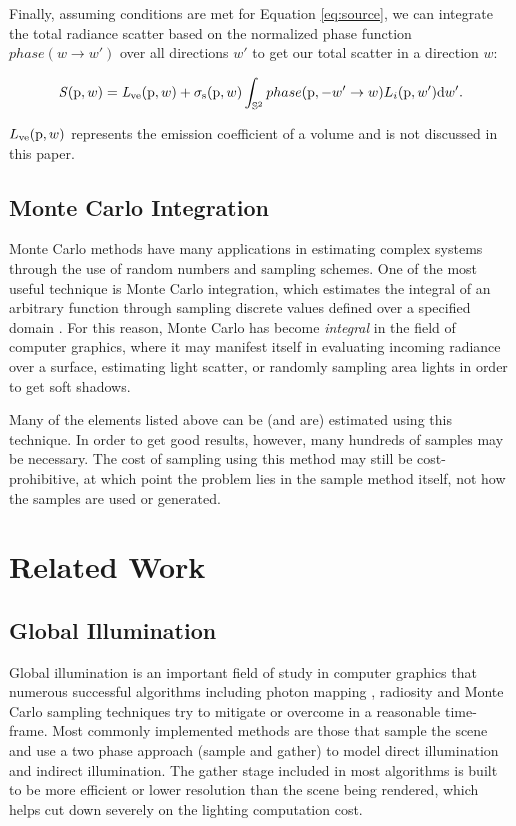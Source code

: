 \documentclass[12pt]{ucthesis}
\begin{document}
Finally, assuming conditions are met for Equation \ref{eq:source}, we can integrate the total radiance scatter based on the normalized phase function $phase(w \to w')$ over all directions $w'$ to get our total scatter in a direction $w$:

\begin{displaymath}
\mathit{S}(\textup{p},w) = \mathit{L}_{\textup{ve}}(\textup{p},w) + \sigma_{\textup{s}}(\textup{p}, w) \int_{\mathbb{S}^2} phase(\textup{p}, -w' \to w) L_{i}(\textup{p},w')\textup{d}w'.
\end{displaymath}

$L_{\textup{ve}}(\textup{p}, w)$ represents the emission coefficient of a volume and is not discussed in this paper.


\section{Monte Carlo Integration}

Monte Carlo methods have many applications in estimating complex systems through the use of random numbers and sampling schemes.  One of the most useful technique is Monte Carlo integration, which estimates the integral of an arbitrary function through sampling discrete values defined over a specified domain \cite{aga}.  For this reason, Monte Carlo has become \textit{integral} in the field of computer graphics, where it may manifest itself in evaluating incoming radiance over a surface, estimating light scatter, or randomly sampling area lights in order to get soft shadows.

Many of the elements listed above can be (and are) estimated using this technique.  In order to get good results, however, many hundreds of samples may be necessary.  The cost of sampling using this method may still be cost-prohibitive, at which point the problem lies in the sample method itself, not how the samples are used or generated.

\chapter{Related Work}

\section{Global Illumination}
Global illumination is an important field of study in computer graphics that numerous successful algorithms including photon mapping \cite{Jensen:2009}, radiosity \cite{radiosity} and Monte Carlo sampling techniques \cite{monte_carlo} try to mitigate or overcome in a reasonable time-frame.  Most commonly implemented methods are those that sample the scene and use a two phase approach (sample and gather) to model direct illumination and indirect illumination.  The gather stage included in most algorithms is built to be more efficient or lower resolution than the scene being rendered, which helps cut down severely on the lighting computation cost.
\end{document}

